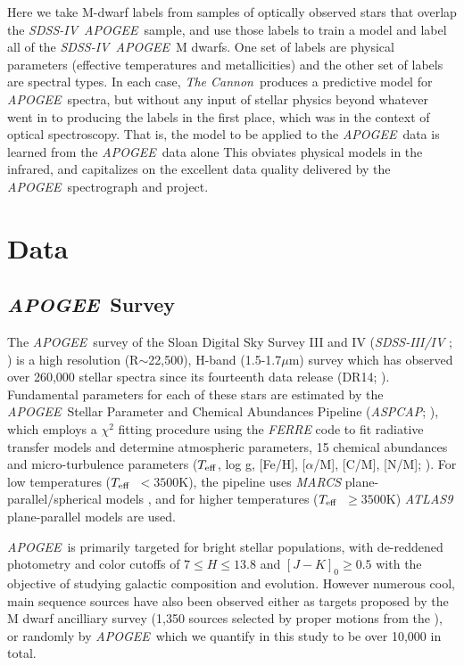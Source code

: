 \documentclass[modern]{aastex62}
\newcommand{\apogee}{\textsl{APOGEE}}
\newcommand{\thecannon}{\textsl{The Cannon}}
\newcommand{\aspcap}{\textsl{ASPCAP}}
\newcommand{\sdssiv}{\textsl{SDSS-IV}}
\newcommand{\teff}{$T_{\rm eff}$}
\begin{document}
Here we take M-dwarf labels from samples of optically observed stars that overlap the
\sdssiv\ \apogee\ sample, and use those labels to train a model and label all of the
\sdssiv\ \apogee\ M dwarfs.
One set of labels are physical parameters (effective temperatures and metallicities)
and the other set of labels are spectral types.
In each case, \thecannon\ produces a predictive model for \apogee\ spectra, but without
any input of stellar physics beyond whatever went in to producing the labels in the first
place, which was in the context of optical spectroscopy.
That is, the model to be applied to the \apogee\ data is learned from the \apogee\ data alone
This obviates physical models in the infrared, and capitalizes on the excellent data quality
delivered by the \apogee\ spectrograph and project.

\section{Data} \label{sec:data}

\subsection{\apogee\ Survey}

The \apogee\ survey \citep{Majewski:2015} of the Sloan Digital Sky Survey III and IV (\textsl{SDSS-III/IV} \citealt{Eisenstein:2011}; \citealt{Blanton:2017}) is a high resolution (R$\sim$22,500), H-band (1.5-1.7$\mu$m) survey which has observed over 260,000 stellar spectra since its fourteenth data release (DR14; \citealt{Abolfathi:2017}). Fundamental parameters for each of these stars are estimated by the \apogee\ Stellar Parameter and Chemical Abundances Pipeline (\aspcap; \citealt{Perez:2016}), which employs a $\chi^2$ fitting procedure using the \textsl{FERRE} code to fit radiative transfer models and determine atmospheric parameters, 15 chemical abundances and micro-turbulence parameters (\teff, log g, [Fe/H], [$\alpha$/M], [C/M], [N/M]; \citealt{Meszaros:2012}). For low temperatures (\teff\ $<3500$K), the pipeline uses \textsl{MARCS} plane-parallel/spherical models \citep{Gustafsson:2008}, and for higher temperatures (\teff\ $\geq3500$K) \textsl{ATLAS9} \citep{Castelli:2004} plane-parallel models are used.

\apogee\ is primarily targeted for bright stellar populations, with de-reddened photometry and color cutoffs of $7 \leq H \leq 13.8$ and $[J-K]_0 \geq 0.5$ \citep{Zasowski:2013} with the objective of studying galactic composition and evolution. However numerous cool, main sequence sources have also been observed either as targets proposed by the M dwarf ancilliary survey (1,350 sources selected by proper motions from the  \citealt{Desphande:2013}), or randomly by \apogee\, which we quantify in this study to be over 10,000 in total.
\end{document}
